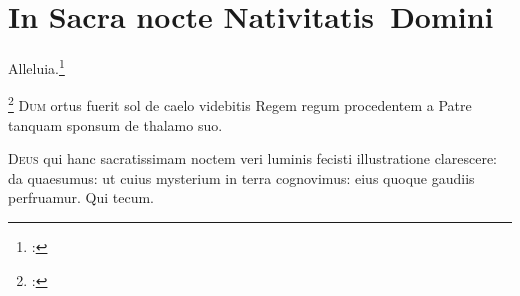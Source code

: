 \chapter{In Sacra nocte Nativitatis~Domini}

Alleluia.\footnote{%
  \cite[98r]{bp1502}: }

\footnote{%
    \cite[98r]{bp1502}: }
\lettrine{D}{um} ortus fuerit sol de caelo videbitis Regem regum
procedentem a Patre tanquam sponsum de thalamo suo.


\lettrine{D}{eus} qui hanc sacratissimam noctem veri luminis fecisti
illustratione clarescere:
da quaesumus: ut cuius mysterium in terra cognovimus:
eius quoque gaudiis perfruamur.
Qui tecum.

\headingCantus

